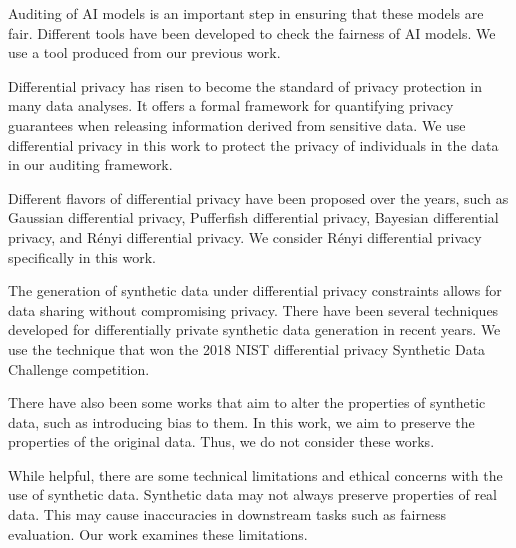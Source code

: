 \documentclass[manuscript,screen,review,anonymous]{acmart}
\begin{document}
Auditing of AI models is an important step in ensuring that these models are fair\cite{ferrara2023fairness}. Different tools have been developed to check the fairness of AI models\cite{saleiro2018aequitas,bellamy2019ai,bird2020fairlearn}. We use a tool produced from our previous work\cite{yuan2024ensuring}.


Differential privacy has risen to become the standard of privacy protection in many data analyses\cite{jiang2021applications}. It offers a formal framework for quantifying privacy guarantees when releasing information derived from sensitive data\cite{dwork2006calibrating,dwork2014algorithmic}. We use differential privacy in this work to protect the privacy of individuals in the data in our auditing framework.

Different flavors of differential privacy have been proposed over the years\cite{desfontaines2019sok}, such as Gaussian differential privacy\cite{dong2022gaussian}, Pufferfish differential privacy\cite{kifer2012rigorous}, Bayesian differential privacy\cite{triastcyn2020bayesian}, and R\'enyi differential privacy\cite{mironov2017renyi}. We consider R\'enyi differential privacy specifically in this work.


The generation of synthetic data\cite{raghunathan2021synthetic,lu2023machine} under differential privacy constraints allows for data sharing without compromising privacy\cite{tao2021benchmarking}. There have been several techniques developed for differentially private synthetic data generation\cite{rosenblatt2020differentially,fan2020relational,bowen2019comparative,bowen2020comparative,arnold2020really,xu2019modeling} in recent years. We use the technique that won the 2018 NIST differential privacy Synthetic Data Challenge competition\cite{mckenna2021winning}.

There have also been some works that aim to alter the properties of synthetic data, such as introducing bias to them\cite{jiang2024synthetic,baumann2023bias}. In this work, we aim to preserve the properties of the original data. Thus, we do not consider these works.

While helpful, there are some technical limitations\cite{stadler2022synthetic,cheng2021can,ganev2022robin,wyllie2024fairness} and ethical concerns\cite{whitney2024real} with the use of synthetic data. Synthetic data may not always preserve properties of real data. This may cause inaccuracies in downstream tasks such as fairness evaluation. Our work examines these limitations.
\end{document}
